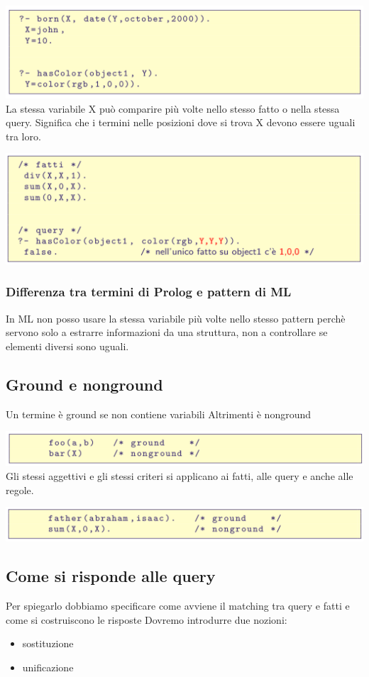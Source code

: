 \documentclass[10pt]{article}
\begin{document}
\includegraphics[scale=0.2]{Immagini/prolog8.png}
\\
La stessa variabile X può comparire più volte nello stesso fatto o
nella stessa query. Significa che i termini nelle posizioni dove si trova X devono
essere uguali tra loro.

\includegraphics[scale=0.2]{Immagini/prolog9.png}
\\
\subsubsection{Differenza tra termini di Prolog e pattern di ML}
In ML non posso usare la stessa variabile più volte nello
stesso pattern
perchè servono solo a estrarre informazioni da una struttura,
non a controllare se elementi diversi sono uguali.
\subsection{Ground e nonground}
Un termine è ground se non contiene variabili
Altrimenti è nonground

\includegraphics[scale=0.2]{Immagini/prolog10.png}
\\
Gli stessi aggettivi e gli stessi criteri si applicano ai fatti, alle
query e anche alle regole.

\includegraphics[scale=0.2]{Immagini/prolog11.png}
\subsection{Come si risponde alle query}
Per spiegarlo dobbiamo specificare come avviene il matching tra
query e fatti e come si costruiscono le risposte
Dovremo introdurre due nozioni:
\begin{itemize}
    \item sostituzione
    \item unificazione
\end{itemize}
\end{document}
